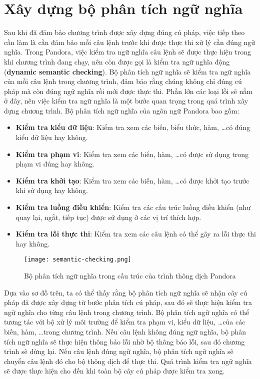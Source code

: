 \section{Xây dựng bộ phân tích ngữ nghĩa}
\label{ch3:semantic-analysis}

    Sau khi đã đảm bảo chương trình được xây dựng đúng cú pháp, việc tiếp theo cần làm là cần đảm bảo mỗi câu lệnh trước khi được thực thi xử lý cần đúng ngữ nghĩa. Trong Pandora, việc kiểm tra ngữ nghĩa câu lệnh sẽ được thực hiện trong khi chương trình đang chạy, nên còn được gọi là kiểm tra ngữ nghĩa động (\textbf{dynamic semantic checking}). Bộ phân tích ngữ nghĩa sẽ kiểm tra ngữ nghĩa của mỗi câu lệnh trong chương trình, đảm bảo rằng chúng không chỉ đúng cú pháp mà còn đúng ngữ nghĩa rồi mới được thực thi. Phần lớn các loại lỗi sẽ nằm ở đây, nên việc kiểm tra ngữ nghĩa là một bước quan trọng trong quá trình xây dựng chương trình. Bộ phân tích ngữ nghĩa của ngôn ngữ Pandora bao gồm:

\begin{itemize}
    \item \textbf{Kiểm tra kiểu dữ liệu}: Kiểm tra xem các biến, biểu thức, hàm, \dots có đúng kiểu dữ liệu hay không.
    \item \textbf{Kiểm tra phạm vi}: Kiểm tra xem các biến, hàm, \dots có được sử dụng trong phạm vi đúng hay không.
    \item \textbf{Kiểm tra khởi tạo}: Kiểm tra xem các biến, hàm, \dots có được khởi tạo trước khi sử dụng hay không.
    \item \textbf{Kiểm tra luồng điều khiển}: Kiểm tra các cấu trúc luồng điều khiển (như quay lại, ngắt, tiếp tục) được sử dụng ở các vị trí thích hợp.
    \item \textbf{Kiểm tra lỗi thực thi}: Kiểm tra xem các câu lệnh có thể gây ra lỗi thực thi hay không.
\end{itemize}

\begin{figure}[H]
    \centering
    \texttt{[image: semantic-checking.png]}
    \caption{Bộ phân tích ngữ nghĩa trong cấu trúc của trình thông dịch Pandora}
\end{figure}

    Dựa vào sơ đồ trên, ta có thể thấy rằng bộ phân tích ngữ nghĩa sẽ nhận cây cú pháp đã được xây dựng từ bước phân tích cú pháp, sau đó sẽ thực hiện kiểm tra ngữ nghĩa cho từng câu lệnh trong chương trình. Bộ phân tích ngữ nghĩa có thể tương tác với bộ xử lý môi trường để kiểm tra phạm vi, kiểu dữ liệu, \dots của các biến, hàm, \dots trong chương trình. Nếu câu lệnh không đúng ngữ nghĩa, bộ phân tích ngữ nghĩa sẽ thực hiện thông báo lỗi nhờ bộ thông báo lỗi, sau đó chương trình sẽ dừng lại. Nếu câu lệnh đúng ngữ nghĩa, bộ phân tích ngữ nghĩa sẽ chuyển câu lệnh đó cho bộ thông dịch để thực thi. Quá trình kiểm tra ngữ nghĩa sẽ được thực hiện cho đến khi toàn bộ cây cú pháp được kiểm tra xong.

